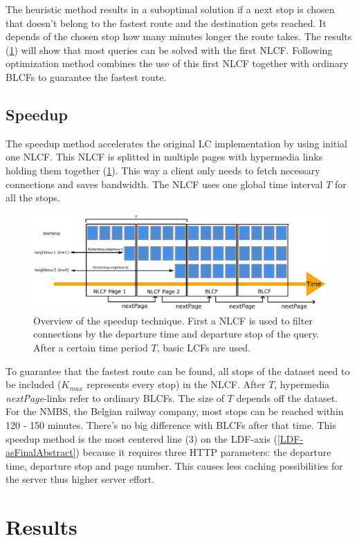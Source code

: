 \documentclass[twocolumn]{phdsymp} %
\begin{document}
The heuristic method results in a suboptimal solution if a next stop is chosen that doesn't belong to the fastest route and the destination gets reached. It depends of the chosen stop how many minutes longer the route takes. The results (\cref{results}) will show that most queries can be solved with the first NLCF.
Following optimization method combines the use of this first NLCF together with ordinary BLCFs to guarantee the fastest route.

\subsection{Speedup}
\label{speedup}

The speedup method accelerates the original LC implementation by using initial one NLCF. This NLCF is splitted in multiple pages with hypermedia links holding them together (\cref{NLCFpaged}). This way a client only needs to fetch necessary connections and saves bandwidth. The NLCF uses one global time interval $T$ for all the stops.
\begin{figure}[ht]
\begin{center}
	\includegraphics[width=.40\textwidth]{NLCFpaged}
	\caption{\label{NLCFpaged}Overview of the speedup technique. First a NLCF is used to filter connections by the departure time and departure stop of the query. After a certain time period $T$, basic LCFs are used.}
\end{center}
\end{figure}

To guarantee that the fastest route can be found, all stops of the dataset need to be included ($K_{max}$ represents every stop) in the NLCF. After $T$, hypermedia \textit{nextPage}-links refer to ordinary BLCFs. The size of $T$ depends off the dataset. For the NMBS, the Belgian railway company, most stops can be reached within 120 - 150 minutes. There's no big difference with BLCFs after that time.
This speedup method is the most centered line (3) on the LDF-axis (\cref{LDF-asFinalAbstract}) because it requires three HTTP parameters: the departure time, departure stop and page number. This causes less caching possibilities for the server thus higher server effort.

\section{Results}
\label{results}
\end{document}

